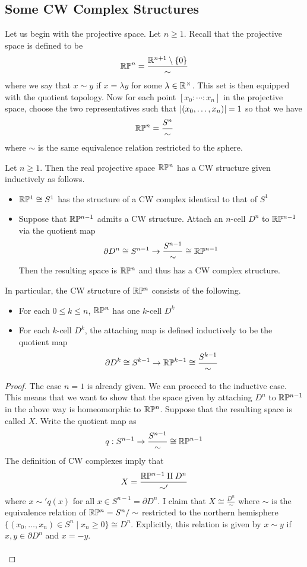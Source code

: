 \documentclass[a4paper]{article}
\begin{document}
\subsection{Some CW Complex Structures}
Let us begin with the projective space. Let $n\geq 1$. Recall that the projective space is defined to be $$\mathbb{R}\mathbb{P}^n=\frac{\mathbb{R}^{n+1}\setminus\{0\}}{\sim}$$ where we say that $x\sim y$ if $x=\lambda y$ for some $\lambda\in\mathbb{R}^\times$. This set is then equipped with the quotient topology. Now for each point $[x_0:\cdots:x_n]$ in the projective space, choose the two representatives such that $\abs{(x_0,\dots,x_n)}=1$ so that we have $$\mathbb{R}\mathbb{P}^n=\frac{S^n}{\sim}$$ where $\sim$ is the same equivalence relation restricted to the sphere. 

\begin{prp}{}{} Let $n\geq 1$. Then the real projective space $\mathbb{R}\mathbb{P}^n$ has a CW structure given inductively as follows. 
\begin{itemize}
\item $\mathbb{R}\mathbb{P}^1\cong S^1$ has the structure of a CW complex identical to that of $S^1$
\item Suppose that $\mathbb{R}\mathbb{P}^{n-1}$ admits a CW structure. Attach an $n$-cell $D^n$ to $\mathbb{R}\mathbb{P}^{n-1}$ via the quotient map $$\partial D^n\cong S^{n-1}\to\frac{S^{n-1}}{\sim}\cong\mathbb{R}\mathbb{P}^{n-1}$$ Then the resulting space is $\mathbb{R}\mathbb{P}^n$ and thus has a CW complex structure. 
\end{itemize}
In particular, the CW structure of $\mathbb{R}\mathbb{P}^n$ consists of the following. 
\begin{itemize}
\item For each $0\leq k\leq n$, $\mathbb{R}\mathbb{P}^n$ has one $k$-cell $D^k$
\item For each $k$-cell $D^k$, the attaching map is defined inductively to be the quotient map $$\partial D^k\cong S^{k-1}\to\mathbb{R}\mathbb{P}^{k-1}\cong\frac{S^{k-1}}{\sim}$$
\end{itemize} \tcbline
\begin{proof}
The case $n=1$ is already given. We can proceed to the inductive case. This means that we want to show that the space given by attaching $D^n$ to $\mathbb{R}\mathbb{P}^{n-1}$ in the above way is homeomorphic to $\mathbb{R}\mathbb{P}^n$. Suppose that the resulting space is called $X$. Write the quotient map as $$q:S^{n-1}\to\frac{S^{n-1}}{\sim}\cong\mathbb{R}\mathbb{P}^{n-1}$$ The definition of CW complexes imply that $$X=\frac{\mathbb{R}\mathbb{P}^{n-1}\amalg D^n}{\sim'}$$ where $x\sim' q(x)$ for all $x\in S^{n-1}=\partial D^n$. I claim that $X\cong\frac{D^n}{\sim}$ where $\sim$ is the equivalence relation of $\mathbb{R}\mathbb{P}^n=S^n/\sim$ restricted to the northern hemisphere $\{(x_0,\dots,x_n)\in S^n\;|\;x_n\geq 0\}\cong D^n$. Explicitly, this relation is given by $x\sim y$ if $x,y\in\partial D^n$ and $x=-y$. \\~\\

\end{proof}
\end{prp}
\end{document}

